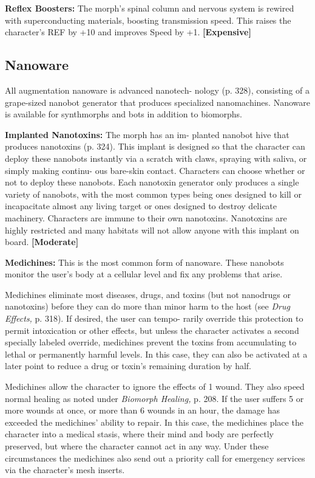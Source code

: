 \textbf{Reflex Boosters:} The morph's spinal column and 
nervous system is rewired with superconducting 
materials, boosting transmission speed. This raises 
the character's REF by +10 and improves Speed by 
+1. \textbf{[Expensive]}

\subsection{Nanoware}

All augmentation nanoware is advanced nanotech-
nology (p. 328), consisting of a grape-sized nanobot 
generator that produces specialized nanomachines. 
Nanoware is available for synthmorphs and bots in 
addition to biomorphs.

\textbf{Implanted Nanotoxins:} The morph has an im-
planted nanobot hive that produces nanotoxins (p. 
324). This implant is designed so that the character 
can deploy these nanobots instantly via a scratch with 
claws, spraying with saliva, or simply making continu-
ous bare-skin contact. Characters can choose whether 
or not to deploy these nanobots. Each nanotoxin 
generator only produces a single variety of nanobots, 
with the most common types being ones designed to 
kill or incapacitate almost any living target or ones 
designed to destroy delicate machinery. Characters 
are immune to their own nanotoxins. Nanotoxins 
are highly restricted and many habitats will not allow 
anyone with this implant on board. \textbf{[Moderate]}

\textbf{Medichines:  }This is the most common form of 
nanoware. These nanobots monitor the user's body at 
a cellular level and fix any problems that arise. 

Medichines eliminate most diseases, drugs, and 
toxins (but not nanodrugs or nanotoxins) before 
they can do more than minor harm to the host (see 
\textit{Drug Effects,} p. 318). If desired, the user can tempo-
rarily override this protection to permit intoxication 
or other effects, but unless the character activates a 
second specially labeled override, medichines prevent 
the toxins from accumulating to lethal or permanently 
harmful levels. In this case, they can also be activated 
at a later point to reduce a drug or toxin's remaining 
duration by half. 

Medichines allow the character to ignore the effects 
of 1 wound. They also speed normal healing as noted 
under \textit{Biomorph Healing,} p. 208. If the user suffers 
5 or more wounds at once, or more than 6 wounds 
in an hour, the damage has exceeded the medichines' 
ability to repair. In this case, the medichines place the 
character into a medical stasis, where their mind and 
body are perfectly preserved, but where the character 
cannot act in any way. Under these circumstances the 
medichines also send out a priority call for emergency 
services via the character's mesh inserts.

